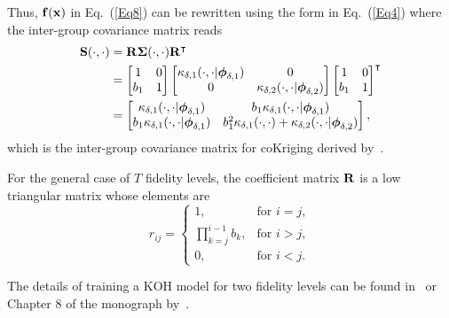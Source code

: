 \documentclass[iicol,sn-basic]{sn-jnl}%
\theoremstyle{thmstyleone}%
\theoremstyle{thmstyletwo}
\theoremstyle{thmstylethree}
\begin{document}
\begin{linenumbers}
Thus, ${\bf f}({\bf x})$ in Eq.~(\ref{Eq8}) can be rewritten using the form in Eq.~(\ref{Eq4}) where the inter-group covariance matrix reads
\begin{equation}\label{Eq10}
	\begin{aligned}
		{\bf S}(\cdot,\cdot) & = {\bf R} {\boldsymbol \Sigma}(\cdot,\cdot) {\bf R}^\intercal \\
		 & = \left[\begin{matrix}
		 	1 & 0 \\
		 	b_1 & 1
		 \end{matrix}\right] 
		 \left[\begin{matrix}
		 	\kappa_{\delta,1}(\cdot,\cdot|{\boldsymbol \phi}_{\delta,1}) & 0 \\
		 	0 & \kappa_{\delta,2}(\cdot,\cdot|{\boldsymbol \phi}_{\delta,2})
		 \end{matrix}\right]
		 \left[\begin{matrix}
		 	1 & 0 \\
		 	b_1 & 1
		 \end{matrix}\right]^\intercal \\
	 & = \left[\begin{matrix}
	 	\kappa_{\delta,1}(\cdot,\cdot|{\boldsymbol \phi}_{\delta,1}) & b_1 \kappa_{\delta,1}(\cdot,\cdot|{\boldsymbol \phi}_{\delta,1}) \\
	 	b_1 \kappa_{\delta,1}(\cdot,\cdot|{\boldsymbol \phi}_{\delta,1}) & b_1^2 \kappa_{\delta,1}(\cdot,\cdot)+\kappa_{\delta,2}(\cdot,\cdot|{\boldsymbol \phi}_{\delta,2})
	 \end{matrix}\right], 
	\end{aligned}
\end{equation}
which is the inter-group covariance matrix for coKriging derived by~\cite{Forrester2007}.

For the general case of $T$ fidelity levels, the coefficient matrix ${\bf R}$ is a low triangular matrix whose elements are~\citep{Garland2020}
\begin{equation}
	 r_{ij} = 
	\begin{cases}
		1, & \text{for } i = j, \\
		\prod_{k=j}^{i-1}b_k, & \text{for } i > j, \\
		0, & \text{for } i < j.
	\end{cases}
\end{equation}

The details of training a KOH model for two fidelity levels can be found in~\cite{Forrester2007} or Chapter 8 of the monograph by~\cite{Forrester2008}. 


\end{linenumbers}
\end{document}

